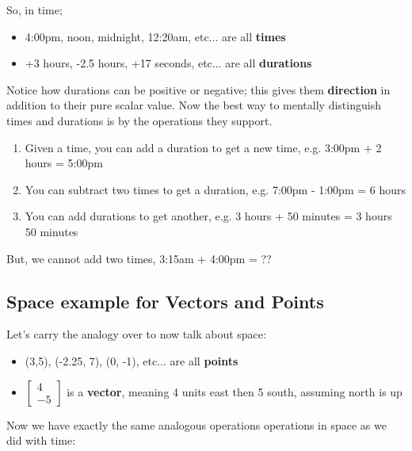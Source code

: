 \documentclass{article}
\begin{document}
So, in time;

\begin{itemize}
    \item 4:00pm, noon, midnight, 12:20am, etc... are all \textbf{times}
    \item +3 hours, -2.5 hours, +17 seconds, etc... are all \textbf{durations}
\end{itemize}

Notice how durations can be positive or negative; this gives them \textbf{direction} in addition to their pure scalar value. Now the best way to mentally distinguish times and durations is by the operations they support.

\begin{enumerate}
    \item Given a time, you can add a duration to get a new time, e.g. 3:00pm + 2 hours = 5:00pm
    \item You can subtract two times to get a duration, e.g. 7:00pm - 1:00pm = 6 hours
    \item You can add durations to get another, e.g. 3 hours + 50 minutes = 3 hours 50 minutes
\end{enumerate}

But, we cannot add two times, 3:15am + 4:00pm = ??

\newpage

\begin{center}
    \section{Space example for Vectors and Points}    
\end{center}

Let's carry the analogy over to now talk about space:

\begin{itemize}
    \item (3,5), (-2.25, 7), (0, -1), etc... are all \textbf{points}
    \item $\begin{bmatrix} 4 \\ -5 \end{bmatrix}$ is a \textbf{vector}, meaning 4 units east then 5 south, assuming north is up
\end{itemize}

Now we have exactly the same analogous operations operations in space as we did with time:
\end{document}
